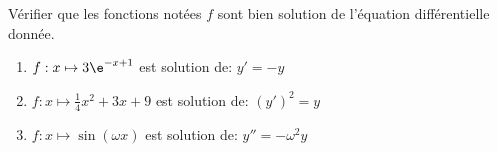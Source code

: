 \begin{exercice}
V\'erifier que les fonctions not\'ees $f$ sont bien solution de
  l'\'equation diff\'erentielle donn\'ee.
  \begin{enumerate}
  \item $f:x\mapsto 3\e^{-x+1}$ est solution de: $y'=- y$

  \item $f:x\mapsto \frac14 x^2+3x+9$ est solution de: $\left(y'\right)^2=y$

  \item $f:x\mapsto\sin(\omega x)$ est solution de: $y''=-\omega^2  y$
  \end{enumerate}
 
\end{exercice}
